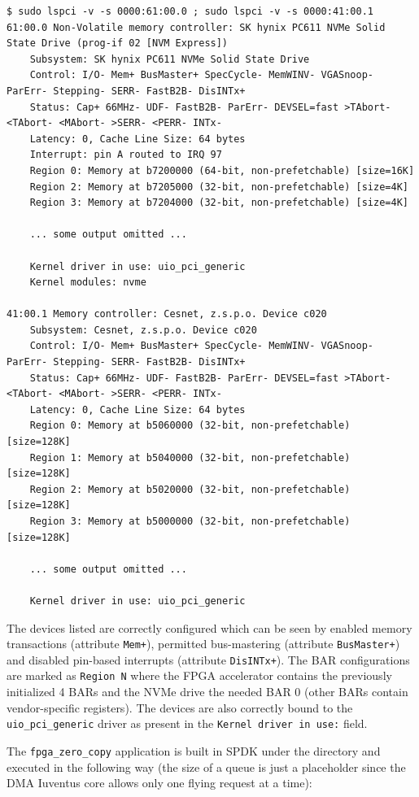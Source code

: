 \begin{lstlisting}[caption={Looking for BAR configuration of unbound devices}]
$ sudo lspci -v -s 0000:61:00.0 ; sudo lspci -v -s 0000:41:00.1
61:00.0 Non-Volatile memory controller: SK hynix PC611 NVMe Solid State Drive (prog-if 02 [NVM Express])
	Subsystem: SK hynix PC611 NVMe Solid State Drive
	Control: I/O- Mem+ BusMaster+ SpecCycle- MemWINV- VGASnoop- ParErr- Stepping- SERR- FastB2B- DisINTx+
	Status: Cap+ 66MHz- UDF- FastB2B- ParErr- DEVSEL=fast >TAbort- <TAbort- <MAbort- >SERR- <PERR- INTx-
	Latency: 0, Cache Line Size: 64 bytes
	Interrupt: pin A routed to IRQ 97
	Region 0: Memory at b7200000 (64-bit, non-prefetchable) [size=16K]
	Region 2: Memory at b7205000 (32-bit, non-prefetchable) [size=4K]
	Region 3: Memory at b7204000 (32-bit, non-prefetchable) [size=4K]

    ... some output omitted ...

	Kernel driver in use: uio_pci_generic
	Kernel modules: nvme

41:00.1 Memory controller: Cesnet, z.s.p.o. Device c020
	Subsystem: Cesnet, z.s.p.o. Device c020
	Control: I/O- Mem+ BusMaster+ SpecCycle- MemWINV- VGASnoop- ParErr- Stepping- SERR- FastB2B- DisINTx+
	Status: Cap+ 66MHz- UDF- FastB2B- ParErr- DEVSEL=fast >TAbort- <TAbort- <MAbort- >SERR- <PERR- INTx-
	Latency: 0, Cache Line Size: 64 bytes
	Region 0: Memory at b5060000 (32-bit, non-prefetchable) [size=128K]
	Region 1: Memory at b5040000 (32-bit, non-prefetchable) [size=128K]
	Region 2: Memory at b5020000 (32-bit, non-prefetchable) [size=128K]
	Region 3: Memory at b5000000 (32-bit, non-prefetchable) [size=128K]

    ... some output omitted ...

	Kernel driver in use: uio_pci_generic
\end{lstlisting}

The devices listed are correctly configured which can be seen by enabled memory transactions
(attribute \verb|Mem+|), permitted bus-mastering (attribute \verb|BusMaster+|) and disabled
pin-based interrupts (attribute \verb|DisINTx+|). The BAR configurations are marked as
\verb|Region N| where the FPGA accelerator contains the previously initialized 4 \acp{BAR} and the
NVMe drive the needed BAR 0 (other BARs contain vendor-specific registers). The devices are also
correctly bound to the \verb|uio_pci_generic| driver as present in the \verb|Kernel driver in use:|
field.

The \verb|fpga_zero_copy| application is built in SPDK under the  directory and
executed in the following way (the size of a queue is just a placeholder since the DMA Iuventus core
allows only one flying request at a time):

